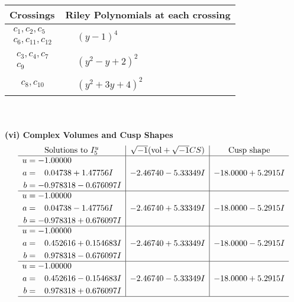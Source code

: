 \documentclass[1p]{elsarticle_modified}
\theoremstyle{definition}
\newcommand{\I}{\sqrt{-1}}
\begin{document}
\begin{tabular}{m{50pt}|m{274pt}}
Crossings & \hspace{64pt}Riley Polynomials at each crossing \\
\hline $$\begin{aligned}c_{1},c_{2},c_{5}\\c_{6},c_{11},c_{12}\end{aligned}$$&$\begin{aligned}
&(y-1)^4
\end{aligned}$\\
\hline $$\begin{aligned}c_{3},c_{4},c_{7}\\c_{9}\end{aligned}$$&$\begin{aligned}
&(y^2- y+2)^2
\end{aligned}$\\
\hline $$\begin{aligned}c_{8},c_{10}\end{aligned}$$&$\begin{aligned}
&(y^2+3 y+4)^2
\end{aligned}$\\
\hline
\end{tabular}\\~\\
\newpage\flushleft \textbf{(vi) Complex Volumes and Cusp Shapes}
$$\begin{array}{c|c|c}  
\text{Solutions to }I^u_{5}& \I (\text{vol} + \sqrt{-1}CS) & \text{Cusp shape}\\
 \hline 
\begin{aligned}
u &= -1.00000\phantom{ +0.000000I} \\
a &= \phantom{-}0.04738 + 1.47756 I \\
b &= -0.978318 - 0.676097 I\end{aligned}
 & -2.46740 - 5.33349 I & -18.0000 + 5.2915 I \\ \hline\begin{aligned}
u &= -1.00000\phantom{ +0.000000I} \\
a &= \phantom{-}0.04738 - 1.47756 I \\
b &= -0.978318 + 0.676097 I\end{aligned}
 & -2.46740 + 5.33349 I & -18.0000 - 5.2915 I \\ \hline\begin{aligned}
u &= -1.00000\phantom{ +0.000000I} \\
a &= \phantom{-}0.452616 + 0.154683 I \\
b &= \phantom{-}0.978318 - 0.676097 I\end{aligned}
 & -2.46740 + 5.33349 I & -18.0000 - 5.2915 I \\ \hline\begin{aligned}
u &= -1.00000\phantom{ +0.000000I} \\
a &= \phantom{-}0.452616 - 0.154683 I \\
b &= \phantom{-}0.978318 + 0.676097 I\end{aligned}
 & -2.46740 - 5.33349 I & -18.0000 + 5.2915 I\\
 \hline 
 \end{array}$$\newpage\newpage\renewcommand{\arraystretch}{1}
\end{document}

